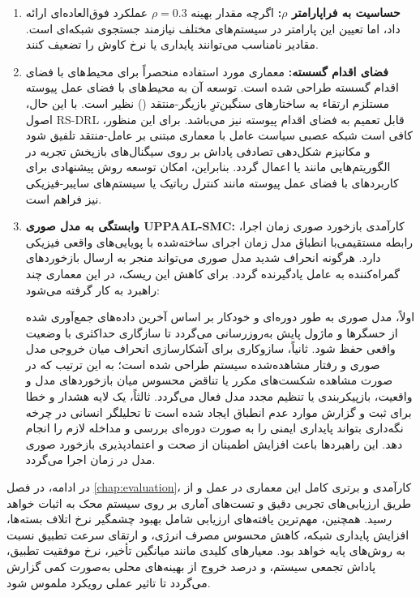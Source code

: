 \documentclass[oneside,openany,phd]{TMU-Thesis}
\begin{document}
\begin{enumerate}

\item \textbf{حساسیت به فراپارامتر $\rho$:} اگرچه مقدار بهینه $\rho=0.3$ عملکرد فوق‌العاده‌ای ارائه داد، اما تعیین این پارامتر در سیستم‌های مختلف نیازمند جستجوی شبکه‌ای است. مقادیر نامناسب می‌توانند پایداری یا نرخ کاوش را تضعیف کنند.

\item \textbf{فضای اقدام گسسته:} معماری  \cite{mnih2015human} مورد استفاده منحصراً برای محیط‌های با فضای اقدام گسسته طراحی شده است. توسعه آن به محیط‌های با فضای عمل پیوسته مستلزم ارتقاء به ساختارهای سنگین‌ترِ بازیگر-منتقد () نظیر  \cite{lillicrap2015continuous} است. با این حال، اصول RS-DRL قابل تعمیم به فضای اقدام پیوسته نیز می‌باشد. برای این منظور، کافی است شبکه عصبی سیاست عامل با معماری مبتنی بر عامل-منتقد تلفیق شود و مکانیزم شکل‌دهی تصادفی پاداش بر روی سیگنال‌های بازپخش تجربه در الگوریتم‌هایی مانند  یا  \cite{haarnoja2018soft} اعمال گردد. بنابراین، امکان توسعه روش پیشنهادی برای کاربردهای با فضای عمل پیوسته مانند کنترل رباتیک یا سیستم‌های سایبر-فیزیکی نیز فراهم است.



\item \textbf{وابستگی به مدل صوری UPPAAL-SMC:} کارآمدی بازخورد صوری زمان اجرا، رابطه مستقیمی‌با انطباق مدل زمان اجرای ساخته‌شده با پویایی‌های واقعی فیزیکی دارد. هرگونه انحراف شدید مدل صوری می‌تواند منجر به ارسال بازخوردهای گمراه‌کننده به عامل یادگیرنده گردد. برای کاهش این ریسک، در این معماری چند راهبرد به کار گرفته می‌شود:\newline

اولاً، مدل صوری به طور دوره‌ای و خودکار بر اساس آخرین داده‌های جمع‌آوری شده از حسگرها و ماژول پایش به‌روزرسانی می‌گردد تا سازگاری حداکثری با وضعیت واقعی حفظ شود. ثانیاً، سازوکاری برای آشکارسازی انحراف میان خروجی مدل صوری و رفتار مشاهده‌شده سیستم طراحی شده است؛ به این ترتیب که در صورت مشاهده شکست‌های مکرر یا تناقض محسوس میان بازخوردهای مدل و واقعیت، بازپیکربندی یا تنظیم مجدد مدل فعال می‌گردد. ثالثاً، یک لایه هشدار و خطا برای ثبت و گزارش موارد عدم انطباق ایجاد شده است تا تحلیلگر انسانی در چرخه نگه‌داری بتواند پایداری ایمنی را به صورت دوره‌ای بررسی و مداخله لازم را انجام دهد. این راهبردها باعث افزایش اطمینان از صحت و اعتمادپذیری بازخورد صوری مدل در زمان اجرا می‌گردد.

\end{enumerate}



در ادامه، در فصل \ref{chap:evaluation}، کارآمدی و برتری کامل این معماری در عمل و از طریق ارزیابی‌های تجربی دقیق و تست‌های آماری بر روی سیستم محک  به اثبات خواهد رسید. همچنین، مهم‌ترین یافته‌های ارزیابی شامل بهبود چشمگیر نرخ اتلاف بسته‌ها، افزایش پایداری شبکه، کاهش محسوس مصرف انرژی، و ارتقای سرعت تطبیق نسبت به روش‌های پایه خواهد بود. معیارهای کلیدی مانند میانگین تأخیر، نرخ موفقیت تطبیق، پاداش تجمعی سیستم، و درصد خروج از بهینه‌های محلی به‌صورت کمی گزارش می‌گردد تا تاثیر عملی رویکرد  ملموس شود.

\newpage










\ifstandalone





\fi
\end{document}
